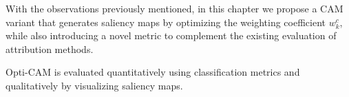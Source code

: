 \noindent With the observations previously mentioned, in this chapter we propose a CAM variant that 
generates saliency maps by optimizing the weighting coefficient $w_k^c$, while also introducing a 
novel metric to complement the existing evaluation of attribution methods.\\


\newpage

\newpage

\newpage
Opti-CAM is evaluated quantitatively using classification metrics and qualitatively by visualizing
 saliency maps.

\newpage

\newpage









